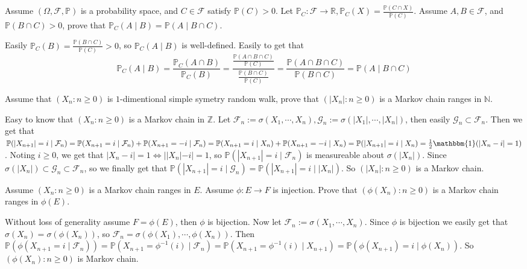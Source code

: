\documentclass[../main]{subfiles}
\begin{document}
\begin{problem}\label{pro:1}
  Assume \((\Omega,\mathcal{F},\mathbb{P})\) is a probability space, and \(C \in \mathcal{F}\) satisfy \(\mathbb{P}(C)>0\).
  Let \(\mathbb{P}_C:\mathcal{F} \to \mathbb{R},\mathbb{P}_C(X)=\frac{\mathbb{P}(C \cap X)}{\mathbb{P}(C)}\).
  Assume \(A,B \in \mathcal{F}\), and \(\mathbb{P}(B \cap C)>0\), prove that
  \(\mathbb{P}_C(A \mid B) = \mathbb{P}(A \mid B \cap C)\).
\end{problem}
\begin{solution}
  Easily \(\mathbb{P}_C(B)=\frac{\mathbb{P}(B \cap C)}{\mathbb{P}(C)}>0\), so \(\mathbb{P}_C(A \mid B)\) is well-defined.
  Easily to get that
  \[
    \mathbb{P}_C(A \mid B)=\frac{\mathbb{P}_C(A \cap B)}{\mathbb{P}_C(B)}=\frac{\frac{\mathbb{P}(A \cap B \cap C)}{\mathbb{P}(C)}}{\frac{\mathbb{P}(B \cap C)}{\mathbb{P}(C)}}=\frac{\mathbb{P}(A \cap B \cap C)}{\mathbb{P}(B \cap C)}=\mathbb{P}(A \mid B \cap C)
  \]
\end{solution}
\begin{problem}\label{pro:2}
  Assume that \((X_n:n \geq 0)\) is \(1\)-dimentional simple symetry random walk, prove that \((|X_n|:n \geq 0)\) is a Markov chain ranges in \(\mathbb{N}\).
\end{problem}
\begin{solution}
  Easy to know that \((X_n:n \geq 0)\) is a Markov chain in \(\mathbb{Z}\).
  Let \(\mathcal{F}_n:=\sigma(X_1,\cdots,X_n),\mathcal{G}_n:=\sigma(|X_1|,\cdots,|X_n|)\), then easily \(\mathcal{G}_n \subset \mathcal{F}_n\).
  Then we get that \(\mathbb{P}(|X_{n+1}|=i \mid \mathcal{F}_n)=\mathbb{P}(X_{n+1}=i \mid \mathcal{F}_n)+\mathbb{P}(X_{n+1}=-i \mid \mathcal{F}_n)=\mathbb{P}(X_{n+1}=i \mid X_n)+\mathbb{P}(X_{n+1}=-i \mid X_n)=\mathbb{P}(|X_{n+1}|=i \mid X_n)=\frac{1}{2}\mathbbm{1}(|X_n-i|=1)\).
  Noting \(i \geq 0\), we get that \(|X_n-i|=1 \iff ||X_n|-i|=1\), so \(\mathbb{P}(|X_{n+1}|=i \mid \mathcal{F}_n)\) is measureable about \(\sigma(|X_n|)\).
  Since \(\sigma(|X_n|)\subset \mathcal{G}_n \subset \mathcal{F}_n\), so we finally get that
  \(\mathbb{P}(|X_{n+1}|=i \mid \mathcal{G}_n)=\mathbb{P}(|X_{n+1}|=i \mid |X_n|)\).
  So \((|X_n|:n \geq 0)\) is a Markov chain.
\end{solution}
\begin{problem}\label{pro:3}
  Assume \((X_n:n \geq 0)\) is a Markov chain ranges in \(E\).
  Assume \(\phi:E \to F\) is injection.
  Prove that \((\phi(X_n):n \geq 0)\) is a Markov chain ranges in \(\phi(E)\).
\end{problem}
\begin{solution}
  Without loss of generality assume \(F=\phi(E)\), then \(\phi\) is bijection.
  Now let \(\mathcal{F}_n:=\sigma(X_1,\cdots,X_n)\).
  Since \(\phi\) is bijection we easily get that \(\sigma(X_n)=\sigma(\phi(X_n))\), so \(\mathcal{F}_n=\sigma(\phi(X_1),\cdots,\phi(X_n))\).
  Then \(\mathbb{P}(\phi(X_{n+1} =i \mid \mathcal{F}_n))=\mathbb{P}(X_{n+1}=\phi^{-1}(i) \mid \mathcal{F}_n)=\mathbb{P}(X_{n+1}=\phi^{-1}(i) \mid X_{n+1})=\mathbb{P}(\phi(X_{n+1})=i \mid \phi(X_n))\).
  So \((\phi(X_n):n \geq 0)\) is Markov chain.
\end{solution}
\end{document}
